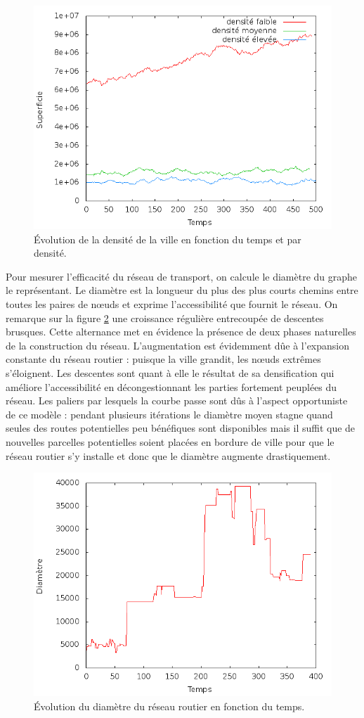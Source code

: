 \documentclass[10pt]{article}
\begin{document}
\begin{figure}[H]
  \centering
  \includegraphics[width=.8\linewidth]{images/area_ALL.png}
  \caption{Évolution de la densité de la ville en fonction du temps et
  par densité.}
  \label{fig:area_density}
\end{figure}

Pour mesurer l'efficacité du réseau de transport, on calcule le
diamètre du graphe le représentant. Le diamètre est la longueur du
plus des plus courts chemins entre toutes les paires de n\oe uds et
exprime l'accessibilité que fournit le réseau. On remarque sur la
figure \ref{fig:diameter} une croissance régulière entrecoupée de
descentes brusques. Cette alternance met en évidence la présence de
deux phases naturelles de la construction du réseau. L'augmentation
est évidemment dûe à l'expansion constante du réseau routier : puisque
la ville grandit, les n\oe uds extrêmes s'éloignent. Les descentes
sont quant à elle le résultat de sa densification qui améliore
l'accessibilité en décongestionnant les parties fortement peuplées du
réseau. Les paliers par lesquels la courbe passe sont dûs à l'aspect
opportuniste de ce modèle : pendant plusieurs itérations le diamètre
moyen stagne quand seules des routes potentielles peu bénéfiques sont
disponibles mais il suffit que de nouvelles parcelles potentielles
soient placées en bordure de ville pour que le réseau routier s'y
installe et donc que le diamètre augmente drastiquement.

\begin{figure}[H]
  \centering
  \includegraphics[width=.8\linewidth]{images/diameter.png}
  \caption{Évolution du diamètre du réseau routier en fonction du temps.}
  \label{fig:diameter}
\end{figure}
\end{document}
